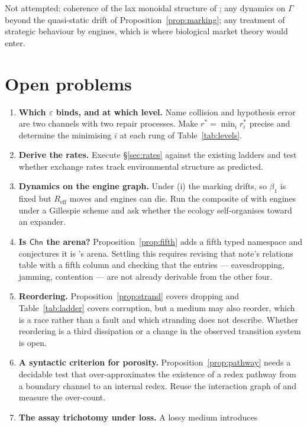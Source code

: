 \documentclass[11pt]{article}
\theoremstyle{plain}
\theoremstyle{definition}
\theoremstyle{remark}
\newcommand{\Chn}{\mathsf{Chn}}
\newcommand{\Reff}{R_{\mathrm{eff}}}
\newcommand{\bt}{\beta_1}
\begin{document}
Not attempted: coherence of the lax monoidal structure of \cite{compose};
any dynamics on $\Gamma$ beyond the quasi-static drift of
Proposition~\ref{prop:marking}; any treatment of strategic behaviour by
engines, which is where biological market theory \cite{noe} would enter.

\section{Open problems}
\label{sec:open}

\begin{enumerate}[itemsep=4pt]
\item \textbf{Which $\varepsilon$ binds, and at which level.} Name
collision and hypothesis error are two channels with two repair processes.
Make $r^\ast = \min_i r^\ast_i$ precise and determine the minimising $i$ at
each rung of Table~\ref{tab:levels}.
\item \textbf{Derive the rates.} Execute \S\ref{sec:rates} against the
existing ladders and test whether exchange rates track environmental
structure as predicted.
\item \textbf{Dynamics on the engine graph.} Under (i) the marking drifts,
so $\bt$ is fixed but $\Reff$ moves and engines can die. Run the composite
of \cite[\S10]{compose} with engines under a Gillespie scheme and ask
whether the ecology self-organises toward an expander.
\item \textbf{Is $\Chn$ the arena?} Proposition~\ref{prop:fifth} adds a
fifth typed namespace and conjectures it is \cite{compose}'s arena.
Settling this requires revising that note's relations table with a fifth
column and checking that the entries --- eavesdropping, jamming,
contention --- are not already derivable from the other four.
\item \textbf{Reordering.} Proposition~\ref{prop:strand} covers dropping
and Table~\ref{tab:ladder} covers corruption, but a medium may also
reorder, which is a race rather than a fault and which stranding does not
describe. Whether reordering is a third dissipation or a change in the
observed transition system is open.
\item \textbf{A syntactic criterion for porosity.}
Proposition~\ref{prop:pathway} needs a decidable test that
over-approximates the existence of a redex pathway from a boundary
channel to an internal redex. Reuse the interaction graph of
\cite[\S12.5]{scientist} and measure the over-count.
\item \textbf{The assay trichotomy under loss.} A lossy medium introduces

\end{enumerate}
\end{document}
